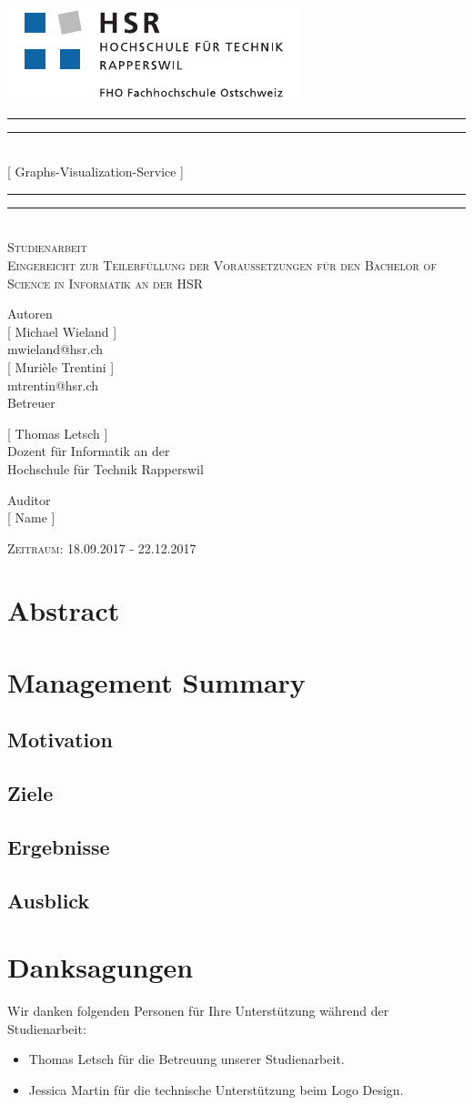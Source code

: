 \documentclass[11pt,a4paper,english,oneside]{book}
\makeatletter
\newcommand*{\plogo}{\includegraphics{logo_hsr.pdf}}
\numberwithin{equation}{chapter}
\newcommand*{\titleGP}{\begingroup %
\centering %
\vspace*{\baselineskip} %
\plogo\\[2\baselineskip] %
\rule{\textwidth}{1.6pt}\vspace*{-\baselineskip}\vspace*{2pt} %
\rule{\textwidth}{0.4pt}\\[\baselineskip] %
{\LARGE [ Graphs-Visualization-Service ]}\\[0.2\baselineskip] %
\rule{\textwidth}{0.4pt}\vspace*{-\baselineskip}\vspace{3.2pt} %
\rule{\textwidth}{1.6pt}\\[2\baselineskip] %
\scshape %
Studienarbeit \\[2\baselineskip]
Eingereicht zur Teilerfüllung der Voraussetzungen für den Bachelor of Science in Informatik an der HSR \par
\vspace*{2\baselineskip}


Autoren\\
{\Large [ Michael Wieland ] \\ [5pt]}
mwieland@hsr.ch \\

{\Large [ Murièle Trentini ] \\ [5pt]}
mtrentin@hsr.ch \\

\vspace*{2\baselineskip}
Betreuer\\
{\Large [ Thomas Letsch ] \\[5pt]
\small Dozent für Informatik an der \\[5pt]Hochschule für Technik Rapperswil\par}
\vspace*{2\baselineskip}

Auditor\\
{\Large [ Name ] \\[5pt]}
\vspace*{2\baselineskip}

\vfill
{\scshape Zeitraum: 18.09.2017 - 22.12.2017} \\[0.3\baselineskip]
\endgroup}
\makeatother
\begin{document}
\thispagestyle{empty}
\titleGP
\newpage
\doublespacing
\setcounter{page}{1}
\section*{Abstract}
\thispagestyle{firststyle}


\newpage

\section*{Management Summary}
\thispagestyle{firststyle}

\subsection*{Motivation}

\subsection*{Ziele}

\subsection*{Ergebnisse}

\subsection*{Ausblick}

\newpage

\section*{Danksagungen}
\thispagestyle{firststyle}

Wir danken folgenden Personen für Ihre Unterstützung während der Studienarbeit:

\begin{itemize}
	\item Thomas Letsch für die Betreuung unserer Studienarbeit.
	\item Jessica Martin für die technische Unterstützung beim Logo Design.
\end{itemize}

\tableofcontents
\listoffigures
\listoftables

\newpage
{}
\end{document}
